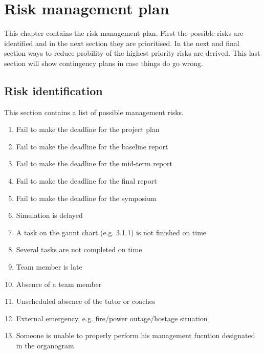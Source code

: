 \section{Risk management plan}
\label{dsePPRiskMP}
This chapter contains the risk management plan. First the possible risks are identified and in the next section they are prioritised. In the next and final section ways to reduce probility of the highest priority risks are derived. This last section will show contingency plans in case things do go wrong.
\subsection{Risk identification}
This section contains a list of possible management risks.
\begin{enumerate}
	\item Fail to make the deadline for the project plan
	\item Fail to make the deadline for the baseline report
	\item Fail to make the deadline for the mid-term report
	\item Fail to make the deadline for the final report
	\item Fail to make the deadline for the symposium
	\item Simulation is delayed
	\item A task on the gannt chart (e.g. 3.1.1) is not finished on time
	\item Several tasks are not completed on time
	\item Team member is late
	\item Absence of a team member
	\item Unscheduled absence of the tutor or coaches
	\item External emergency, e.g. fire/power outage/hostage situation
	\item Someone is unable to properly perform his management fucntion 		  						designated in the organogram
\end{enumerate}
